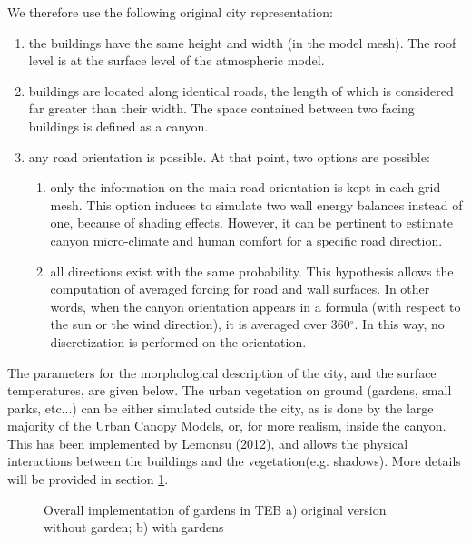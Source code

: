 We therefore use the following original city representation:
\begin{enumerate}
\item the buildings have the same height and width (in the model mesh).
The roof level is at the surface level of the atmospheric model.
\item buildings are located along identical roads, the length
of which is considered
far greater than their width. The space contained between two facing buildings
is defined as a canyon.
\item any road orientation is possible. At that point, two options are possible:
\begin{enumerate}
\item only the information on the main road orientation is kept in each grid mesh. This option induces to simulate two wall energy balances instead of one, because of shading effects. However, it can be pertinent to estimate canyon micro-climate and human comfort for a specific road direction.
\item all directions exist with the same probability. This hypothesis allows the computation of averaged forcing for road and wall surfaces. In other words, when the canyon orientation appears in a formula (with respect to the sun or the wind direction), it is averaged over 360$^\circ$. In this way, no discretization is performed on the orientation.
\end{enumerate}
\end{enumerate}

The parameters for the morphological description of the city, and the surface temperatures, are given below. The urban vegetation on ground (gardens, small parks, etc...) can be either simulated outside the city, as is done by the large majority of the Urban Canopy Models, or, for more realism, inside the canyon. This has been implemented by Lemonsu \etal (2012)\nocite{Lemonsu2012}, and allows the physical interactions between the buildings and the vegetation(e.g. shadows). More details will be provided in section \ref{garden}.

\begin{figure}[t]
\hspace*{0.cm}
\caption{Overall implementation of gardens in TEB a) original version without garden; b) with gardens}
\label{garden}
\end{figure}


